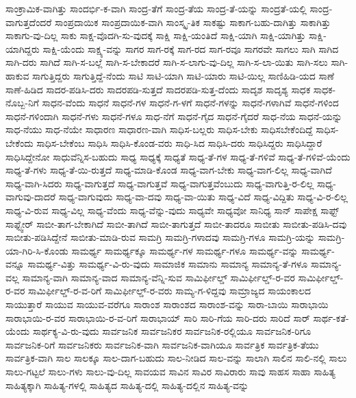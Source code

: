 {ಸಾಂಕ್ರಾಮಿಕ-ವಾಗಿತ್ತು
ಸಾಂದರ್ಭಿ-ಕ-ವಾಗಿ
ಸಾಂದ್ರ-ತೆಗೆ
ಸಾಂದ್ರ-ತೆಯ
ಸಾಂದ್ರ-ತೆ-ಯನ್ನು
ಸಾಂದ್ರತೆ-ಯಲ್ಲಿ
ಸಾಂದ್ರ-ವಾಗುತ್ತದೆಂದರೆ
ಸಾಂಪ್ರದಾಯಿಕ
ಸಾಂಪ್ರದಾಯಿಕ-ವಾಗಿ
ಸಾಂಸ್ಕೃ-ತಿಕ
ಸಾಕಷ್ಟು
ಸಾಕಾಗ-ಬಹು-ದಾಗಿತ್ತು
ಸಾಕಾಗಿತ್ತು
ಸಾಕಾಗು-ವು-ದಿಲ್ಲ
ಸಾಕು
ಸಾಕ್ಷ-ವೊದಗಿ-ಸು-ವುದಕ್ಕೆ
ಸಾಕ್ಷಿ
ಸಾಕ್ಷಿ-ಯಂತಿದೆ
ಸಾಕ್ಷಿ-ಯಾಗಿ
ಸಾಕ್ಷಿ-ಯಾಗಿತ್ತು
ಸಾಕ್ಷಿ-ಯಾಗಿದ್ದರು
ಸಾಕ್ಷಿ-ಯೆಂದು
ಸಾಕ್ಷ್ಯ-ವನ್ನು
ಸಾಗರ
ಸಾಗ-ರಕ್ಕೆ
ಸಾಗ-ರದ
ಸಾಗ-ರವೂ
ಸಾಗರವೇ
ಸಾಗಲು
ಸಾಗಿ
ಸಾಗಿದ
ಸಾಗಿ-ದರು
ಸಾಗಿದೆ
ಸಾಗಿ-ಸ-ಬಲ್ಲೆ
ಸಾಗಿ-ಸ-ಬೇಕಾದರೆ
ಸಾಗಿ-ಸ-ಲಾಗು-ವು-ದಿಲ್ಲ
ಸಾಗಿ-ಸ-ಲಾ-ಯಿತು
ಸಾಗಿ-ಸಲು
ಸಾಗಿ-ಹಾಕುವ
ಸಾಗುತ್ತಿದ್ದರು
ಸಾಗುತ್ತಿದ್ದೆ-ನೆಂದು
ಸಾಟಿ
ಸಾಟಿ-ಯಾಗಿ
ಸಾಟಿ-ಯಾರು
ಸಾಟಿ-ಯಿಲ್ಲ
ಸಾಣಿಹಿಡಿ-ಯದ
ಸಾಣೆ
ಸಾಣೆ-ಹಿಡಿದ
ಸಾದರ-ಪಡಿಸಿ-ದರು
ಸಾದರಪಡಿ-ಸುತ್ತದೆ
ಸಾದರಪಡಿ-ಸುತ್ತ-ದೆಂದು
ಸಾದೃಶ
ಸಾದೃಶ್ಯ
ಸಾಧಕ
ಸಾಧಕ-ನೊಬ್ಬ-ನಿಗೆ
ಸಾಧನ-ವೆಂದು
ಸಾಧನೆ
ಸಾಧನೆ-ಗಳ
ಸಾಧನೆ-ಗ-ಳಗೆ
ಸಾಧನೆ-ಗಳನ್ನು
ಸಾಧನೆ-ಗಳಾಗಿವೆ
ಸಾಧನೆ-ಗಳಿಂದ
ಸಾಧನೆ-ಗಳಿಂದಾಗಿ
ಸಾಧನೆ-ಗಳು
ಸಾಧನೆ-ಗಳೂ
ಸಾಧ-ನೆಗೆ
ಸಾಧನೆ-ಗೈದ
ಸಾಧನೆ-ಗೈದರೆ
ಸಾಧ-ನೆಯ
ಸಾಧನೆ-ಯನ್ನು
ಸಾಧ-ನೆಯು
ಸಾಧ-ನೆಯೇ
ಸಾಧಾರಣ
ಸಾಧಾರಣ-ವಾಗಿ
ಸಾಧಿಸ-ಬಲ್ಲರು
ಸಾಧಿಸ-ಬೇಕು
ಸಾಧಿಸಬೇಕೆಂದಿದ್ದೆ
ಸಾಧಿಸ-ಬೇಕೆಂದು
ಸಾಧಿಸ-ಬೇಕೆಂಬ
ಸಾಧಿಸಿ
ಸಾಧಿಸಿ-ಕೊಂಡ-ವರು
ಸಾಧಿ-ಸಿದ
ಸಾಧಿಸಿ-ದರು
ಸಾಧಿಸಿದ್ದರು
ಸಾಧಿಸಿದ್ದಾರೆ
ಸಾಧಿಸಿದ್ದೇನೋ
ಸಾಧುವೆನ್ನಿಸ-ಬಹುದು
ಸಾಧ್ಯ
ಸಾಧ್ಯಕ್ಕೆ
ಸಾಧ್ಯತೆ
ಸಾಧ್ಯ-ತೆ-ಗಳ
ಸಾಧ್ಯ-ತೆ-ಗಳಿವೆ
ಸಾಧ್ಯ-ತೆ-ಗಳಿವೆ-ಯೆಂದು
ಸಾಧ್ಯ-ತೆ-ಗಳು
ಸಾಧ್ಯ-ತೆ-ಯಿ-ರುತ್ತದೆ
ಸಾಧ್ಯ-ಮಾಡಿ-ಕೊಂಡ
ಸಾಧ್ಯ-ವಾಗ-ಬೇಕು
ಸಾಧ್ಯ-ವಾಗ-ಲಿಲ್ಲ
ಸಾಧ್ಯ-ವಾಗಿದೆ
ಸಾಧ್ಯ-ವಾಗಿ-ಸಿದರು
ಸಾಧ್ಯ-ವಾಗುತ್ತದೆ
ಸಾಧ್ಯ-ವಾಗುತ್ತವೆ
ಸಾಧ್ಯ-ವಾಗುತ್ತವೆಂಬುದು
ಸಾಧ್ಯ-ವಾಗುತ್ತಿ-ರ-ಲಿಲ್ಲ
ಸಾಧ್ಯ-ವಾಗುವು-ದಾದರೆ
ಸಾಧ್ಯ-ವಾಗುವುದು
ಸಾಧ್ಯ-ವಾ-ದವು
ಸಾಧ್ಯ-ವಾ-ಯಿತು
ಸಾಧ್ಯ-ವಿದೆ
ಸಾಧ್ಯ-ವಿದ್ದಿತು
ಸಾಧ್ಯ-ವಿ-ರ-ಲಿಲ್ಲ
ಸಾಧ್ಯ-ವಿ-ರುವ
ಸಾಧ್ಯ-ವಿಲ್ಲ
ಸಾಧ್ಯ-ವೆಂದು
ಸಾಧ್ಯ-ವೆನ್ನು-ವುದು
ಸಾಧ್ಯವೇ
ಸಾಧ್ಯವೋ
ಸಾನಿಧ್ಯ
ಸಾನ್
ಸಾಪೇಕ್ಷ
ಸಾಫ್ಟ್
ಸಾಫ್ಟ್ವೇರ್
ಸಾಬೀ-ತಾಗ-ಬೇಕಾಗಿದೆ
ಸಾಬೀ-ತಾಗಿದೆ
ಸಾಬೀ-ತಾಗುತ್ತದೆ
ಸಾಬೀ-ತಾದರೂ
ಸಾಬೀತು
ಸಾಬೀತು-ಪಡಿಸಿ-ದವು
ಸಾಬೀತು-ಪಡಿಸಿದ್ದೇನೆ
ಸಾಬೀತು-ಮಾಡಿ-ರುವ
ಸಾಮಗ್ರಿ
ಸಾಮಗ್ರಿ-ಗಳಾದವು
ಸಾಮಗ್ರಿ-ಗಳೂ
ಸಾಮಗ್ರಿ-ಯನ್ನು
ಸಾಮಗ್ರಿ-ಯಾ-ಗಿರಿ-ಸಿ-ಕೊಂಡು
ಸಾಮರ್ಥ್ಯ
ಸಾಮರ್ಥ್ಯಕ್ಕೂ
ಸಾಮರ್ಥ್ಯ-ಗಳ
ಸಾಮರ್ಥ್ಯ-ಗಳೂ
ಸಾಮರ್ಥ್ಯ-ವನ್ನು
ಸಾಮರ್ಥ್ಯ-ವನ್ನೂ
ಸಾಮರ್ಥ್ಯ-ವಿತ್ತು
ಸಾಮರ್ಥ್ಯ-ವಿ-ರು-ವುದು
ಸಾಮಾಜಿಕ
ಸಾಮಾನು
ಸಾಮಾನ್ಯ
ಸಾಮಾನ್ಯ-ತೆ-ಗಳೂ
ಸಾಮಾನ್ಯ-ವಲ್ಲ
ಸಾಮಾನ್ಯ-ವಾಗಿ
ಸಾಮಾನ್ಯ-ವಾದ
ಸಾಮಾನ್ಯ-ವೆನ್ನಿ-ಸುವ
ಸಾಮಿರ್ಫೀಲ್ಡ್
ಸಾಮಿರ್ಫೀಲ್ಡ್-ರ-ವರ
ಸಾಮಿರ್ಫೀಲ್ಡ್-ರ-ವರ
ಸಾಮಿರ್ಫೀಲ್ಡ್-ರ-ವ-ರಿಗೆ
ಸಾಮಿರ್ಫೀಲ್ಡ್-ರ-ವರು
ಸಾಮ್ಯ-ಗ-ಳಿದ್ದವು
ಸಾಮ್ರಾಜ್ಯದ
ಸಾಯಂಕಾಲದ
ಸಾಯುತ್ತಾರೆ
ಸಾಯುವ
ಸಾಯುವ-ವರೆಗೂ
ಸಾರಾಂಶ
ಸಾರಾಂಶದ
ಸಾರಾಂಶ-ವನ್ನು
ಸಾರಾ-ಬಾಯಿ
ಸಾರಾಭಾಯಿ
ಸಾರಾಭಾಯಿ-ರ-ವರ
ಸಾರಾಭಾಯಿ-ರ-ವ-ರಿಗೆ
ಸಾರಾಭಾಯ್
ಸಾರಿ
ಸಾರಿ-ಗೆಯ
ಸಾರಿ-ದರು
ಸಾರಿದೆ
ಸಾರ್
ಸಾರ್ಥ-ಕತೆ-ಯೆಂದು
ಸಾರ್ಥಕ್ಯ-ವಿ-ರು-ವುದು
ಸಾರ್ವಜನಿಕ
ಸಾರ್ವಜನಿಕರ
ಸಾರ್ವಜನಿಕ-ರಲ್ಲಿಯೂ
ಸಾರ್ವಜನಿಕ-ರಿಗೂ
ಸಾರ್ವಜನಿಕ-ರಿಗೆ
ಸಾರ್ವಜನಿಕರು
ಸಾರ್ವಜನಿಕ-ವಾಗಿ
ಸಾರ್ವಜನಿಕ-ವಾಗಿಯೂ
ಸಾರ್ವತ್ರಿಕ
ಸಾರ್ವತ್ರಿಕ-ತೆಯು
ಸಾರ್ವತ್ರಿಕ-ವಾಗಿ
ಸಾಲ
ಸಾಲಕ್ಕೂ
ಸಾಲ-ದಾಗ-ಬಹುದು
ಸಾಲ-ನೀಡಿದ
ಸಾಲ-ವನ್ನು
ಸಾಲಾಗಿ
ಸಾಲಿನ
ಸಾಲಿ-ನಲ್ಲಿ
ಸಾಲು
ಸಾಲು-ಗಟ್ಟಲೆ
ಸಾಲು-ಗಳು
ಸಾಲು-ವು-ದಿಲ್ಲ
ಸಾವಯವ
ಸಾವಿನ
ಸಾವಿರ
ಸಾವಿರಾರು
ಸಾವು
ಸಾಹಸ
ಸಾಹಾ
ಸಾಹಿತ್ಯ
ಸಾಹಿತ್ಯಕ್ಕಾಗಿ
ಸಾಹಿತ್ಯ-ಗಳಲ್ಲಿ
ಸಾಹಿತ್ಯದ
ಸಾಹಿತ್ಯ-ದಲ್ಲಿ
ಸಾಹಿತ್ಯ-ದಲ್ಲಿನ
ಸಾಹಿತ್ಯ-ವನ್ನು
}
